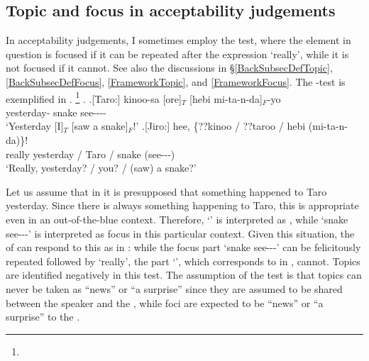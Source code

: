 \subsection{Topic and focus in acceptability judgements}

In acceptability judgements,
I sometimes employ the  test,
where the element in question is focused if it can be repeated after the expression  `really',
while it is not focused if it cannot.
See also the discussions in \S \ref{BackSubsecDefTopic}, \ref{BackSubsecDefFocus}, \ref{FrameworkTopic}, and \ref{FrameworkFocus}.
The -test is exemplified in \Next.%
 \footnote{
 }
\ex.\label{Fr:Method:Ex:Hebi} \ag.[Taro:] kinoo-sa [ore]$_{T}$ [hebi mi-ta-n-da]$_{F}$-yo \\
		yesterday-  snake see---- \\
	`Yesterday [I]$_{T}$ [saw a snake]$_{F}$!'
	\bg.[Jiro:] hee, \{??kinoo / ??taroo / hebi (mi-ta-n-da)\}! \\
			really yesterday / Taro / snake (see---) \\
			`Really, yesterday? / you? / (saw) a snake?'

Let us assume that in \Last[-Taro] it is presupposed that something happened to Taro yesterday.
Since there is always something happening to Taro,
this  is appropriate even in an out-of-the-blue context.
Therefore,
 `' is interpreted as ,
while  `snake see---' is interpreted as focus in this particular context.
Given this situation,
the  of \Last[-Taro] can respond to this  as in \Last[-Jiro]:
while the focus part  `snake see---' can be felicitously repeated followed by  `really',
the  part  `',
which corresponds to  in \Last[-Jiro], cannot.
Topics are identified negatively in this test.
The assumption of the  test is that
topics can never be taken as ``news'' or ``a surprise'' since they are assumed to be shared between the speaker and the ,
while foci are expected to be ``news'' or ``a surprise'' to the .

